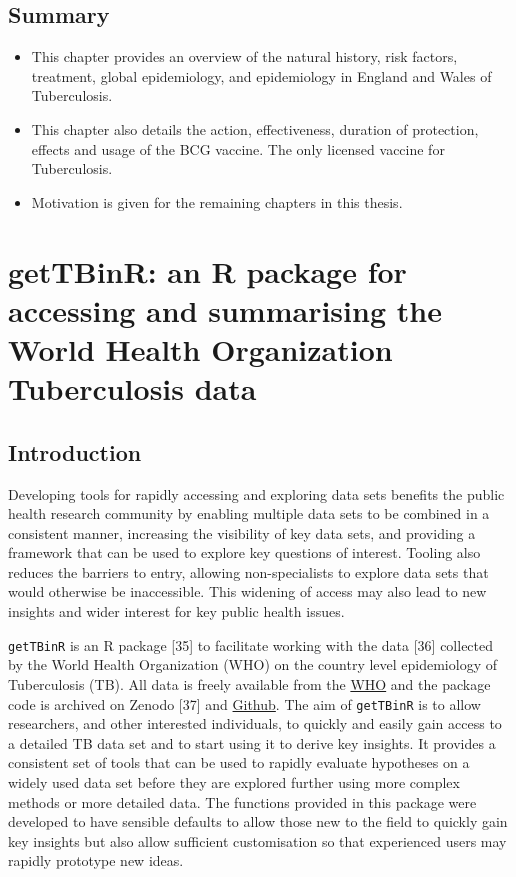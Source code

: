 \documentclass[11pt,twoside]{bristolthesis}
\begin{document}
  \hypertarget{summary-1}{%
  \section{Summary}\label{summary-1}}
  \begin{itemize}
  \item
    This chapter provides an overview of the natural history, risk factors, treatment, global epidemiology, and epidemiology in England and Wales of Tuberculosis.
  \item
    This chapter also details the action, effectiveness, duration of protection, effects and usage of the BCG vaccine. The only licensed vaccine for Tuberculosis.
  \item
    Motivation is given for the remaining chapters in this thesis.
  \end{itemize}
  \hypertarget{getTBinR}{%
  \chapter{getTBinR: an R package for accessing and summarising the World Health Organization Tuberculosis data}\label{getTBinR}}
  
  \hypertarget{introduction-1}{%
  \section{Introduction}\label{introduction-1}}
  
  Developing tools for rapidly accessing and exploring data sets benefits the public health research community by enabling multiple data sets to be combined in a consistent manner, increasing the visibility of key data sets, and providing a framework that can be used to explore key questions of interest. Tooling also reduces the barriers to entry, allowing non-specialists to explore data sets that would otherwise be inaccessible. This widening of access may also lead to new insights and wider interest for key public health issues.
  
  \texttt{getTBinR} is an R package {[}35{]} to facilitate working with the data {[}36{]} collected by the World Health Organization (WHO) on the country level epidemiology of Tuberculosis (TB). All data is freely available from the \href{https://www.who.int/tb/country/data/download/en/}{WHO} and the package code is archived on Zenodo {[}37{]} and \href{https://www.samabbott.co.uk/getTBinR/}{Github}. The aim of \texttt{getTBinR} is to allow researchers, and other interested individuals, to quickly and easily gain access to a detailed TB data set and to start using it to derive key insights. It provides a consistent set of tools that can be used to rapidly evaluate hypotheses on a widely used data set before they are explored further using more complex methods or more detailed data. The functions provided in this package were developed to have sensible defaults to allow those new to the field to quickly gain key insights but also allow sufficient customisation so that experienced users may rapidly prototype new ideas.
  
\end{document}
